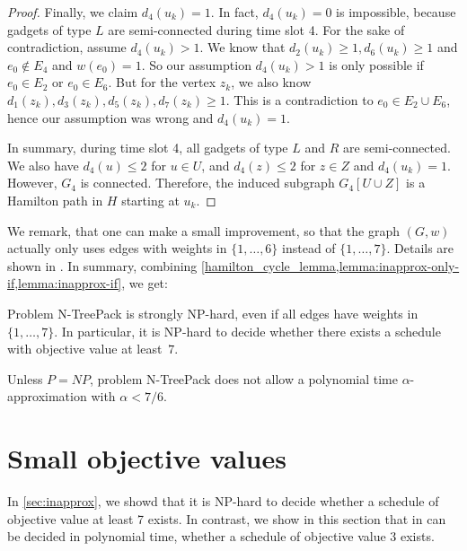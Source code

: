 \documentclass[runningheads]{llncs}
\newcommand{\set}[1]{\{ #1 \}}
\newcommand{\fromto}[2]{\set{#1, \ldots, #2}}
\newcommand{\xxxNTP}{{\sc N-TreePack}}
\begin{document}
\begin{proof}
Finally, we claim $d_4(u_k) = 1$. In fact, $d_4(u_k) = 0$ is impossible, because gadgets of type $L$ are semi-connected during time slot 4. For the sake of contradiction, assume $d_4(u_k) > 1$. We know that $d_2(u_k) \geq 1, d_6(u_k) \geq 1$ and $e_0 \not\in E_4$ and $w(e_0) = 1$. So our assumption $d_4(u_k) > 1$ is only possible if $e_0 \in E_2$ or $e_0 \in E_6$. But for the vertex $z_k$, we also know $d_1(z_k), d_3(z_k), d_5(z_k), d_7(z_k) \geq 1$. This is a contradiction to $e_0 \in E_2 \cup E_6$, hence our assumption was wrong and $d_4(u_k) = 1$.

In summary, during time slot 4, all gadgets of type $L$ and $R$ are semi-connected. We also have $d_4(u) \leq 2$ for $u \in U$, and $d_4(z) \leq 2$ for $z \in Z$ and $d_4(u_k) = 1$. However, $G_4$ is connected. Therefore, the induced subgraph $G_4[U \cup Z]$ is a Hamilton path in $H$ starting at $u_k$.
\end{proof}

We remark, that one can make a small improvement, so that the graph $(G, w)$ actually only uses edges with weights in $\fromto{1}{6}$ instead of $\fromto{1}{7}$. Details are shown in . In summary, combining \cref{hamilton_cycle_lemma,lemma:inapprox-only-if,lemma:inapprox-if}, we get:

\begin{theorem}
\label{th:small-weights}
Problem {\xxxNTP} is strongly NP-hard, even if all edges have weights in $\fromto{1}{7}$.
In particular, it is NP-hard to decide whether there exists a schedule with objective value at least~$7$.
\end{theorem}

\begin{corollary}
\label{coro:inapproximability}
Unless $P=NP$, problem {\xxxNTP} does not allow a polynomial time $\alpha$-approximation 
with $\alpha<7/6$.
\end{corollary}

\section{Small objective values}
\label{sec:small-objective}
In \cref{sec:inapprox}, we showd that it is NP-hard to decide whether a schedule of objective value at least 7 exists. In contrast, we show in this section that in can be decided in polynomial time, whether a schedule of objective value 3 exists.
\end{document}
